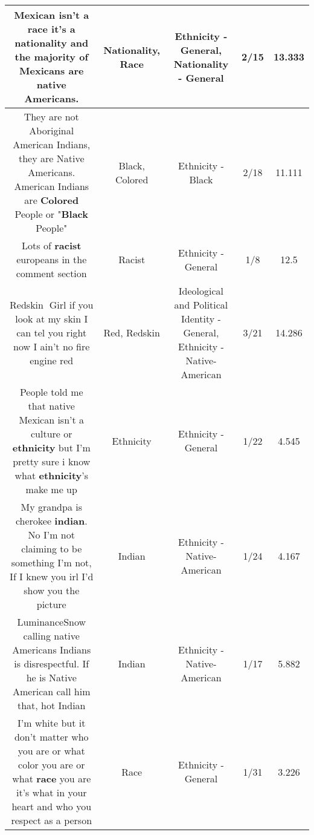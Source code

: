 \documentclass[11pt]{article}
\newlength\mylength
\begin{document}
\begin{center}
\begin{longtable}{|C{.65\mylength}|C{.30\mylength}|C{.12\mylength}|C{.12\mylength}|C{.12\mylength}|}
  \small Mexican isn't a \textbf{race} it's a \textbf{nationality}  and the majority of Mexicans are native Americans.\normalsize   & Nationality, Race & Ethnicity - General, Nationality - General & 2/15 & 13.333 \\  \hline
  \small They are not Aboriginal American Indians, they are Native Americans. American Indians are \textbf{Colored} People or "\textbf{Black} People"\normalsize   & Black, Colored & Ethnicity - Black & 2/18 & 11.111 \\  \hline
  \small Lots of \textbf{racist} europeans in the comment section\normalsize   & Racist & Ethnicity - General & 1/8 & 12.5 \\  \hline
  \small Redskin🤮 Girl if you look at my skin I can tel you right now I ain't no fire engine red\normalsize   & Red, Redskin &  Ideological and Political Identity - General, Ethnicity - Native-American & 3/21 & 14.286 \\  \hline
  \small People told me that native Mexican isn't a culture or \textbf{ethnicity} but I'm pretty sure i know what \textbf{ethnicity}'s make me up\normalsize   & Ethnicity & Ethnicity - General & 1/22 & 4.545 \\  \hline
  \small My grandpa is cherokee \textbf{indian}. No I'm not claiming to be something I'm not, If I knew you irl I'd show you the picture\normalsize   & Indian & Ethnicity - Native-American & 1/24 & 4.167 \\  \hline
  \small LuminanceSnow calling native Americans Indians is disrespectful. If he is Native American call him that, hot Indian\normalsize   & Indian & Ethnicity - Native-American & 1/17 & 5.882 \\  \hline
  \small I'm white but it don't matter who you are or what color you are or what \textbf{race} you  are it's what in your heart and who you respect  as a person\normalsize   & Race & Ethnicity - General & 1/31 & 3.226 \\  \hline

\end{longtable}
\end{center}
\end{document}
